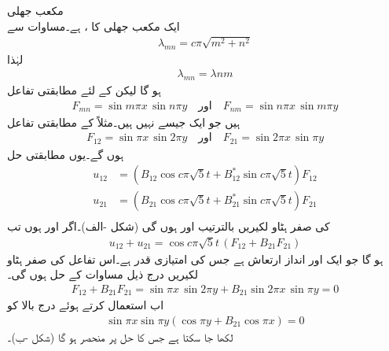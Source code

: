 \quad مکعب جھلی\\
ایک مکعب جھلی کا ،  ہے۔مساوات  سے 
\begin{align}\label{مساوات_جزوی_مثال_مکعب_جھلی_الف}
\lambda_{mn}=c\pi\sqrt{m^2+n^2}
\end{align}
لہٰذا 
\begin{align*}
\lambda_{mn}=\lambda{nm}
\end{align*}
ہو گا لیکن  کے لئے مطابقتی  تفاعل
\begin{align*}
F_{mn}=\sin m\pi x\,\sin n\pi y \quad \text{اور} \quad F_{nm}=\sin n\pi x\,\sin m\pi y
\end{align*}
ہیں جو ایک جیسے نہیں ہیں۔مثلاً  کے مطابقتی تفاعل
\begin{align*}
F_{12}=\sin \pi x\,\sin 2\pi y\quad \text{اور}\quad F_{21}=\sin 2\pi x\,\sin \pi y
\end{align*}
ہوں گے۔یوں مطابقتی حل
\begin{align*}
u_{12}&=(B_{12}\cos c\pi\sqrt{5}t+B^*_{12}\sin c\pi\sqrt{5}t)F_{12}\\
u_{21}&=(B_{21}\cos c\pi\sqrt{5}t+B^*_{21}\sin c\pi\sqrt{5}t)F_{21}\\
\end{align*}
کی صفر ہٹاو لکیریں  بالترتیب  اور  ہوں گی (شکل -الف)۔اگر  اور  ہوں تب
\begin{align}\label{مساوات_جزوی_ایک_بی_کے_حل}
u_{12}+u_{21}=\cos c\pi\sqrt{5}t\,(F_{12}+B_{21}F_{21})
\end{align}
ہو گا جو ایک اور انداز ارتعاش ہے جس کی امتیازی قدر  ہے۔اس تفاعل کی صفر ہٹاو لکیریں درج ذیل مساوات کے حل ہوں گی۔
\begin{align*}
F_{12}+B_{21}F_{21}=\sin \pi x\,\sin 2\pi y+B_{21}\sin 2\pi x\,\sin \pi y=0
\end{align*}
اب  استعمال کرتے ہوئے درج بالا کو 
\begin{align}
\sin \pi x\sin \pi y(\cos \pi y+B_{21}\cos \pi x)=0
\end{align}
لکھا جا سکتا ہے جس کا حل  پر منحصر ہو گا (شکل -ب)۔

